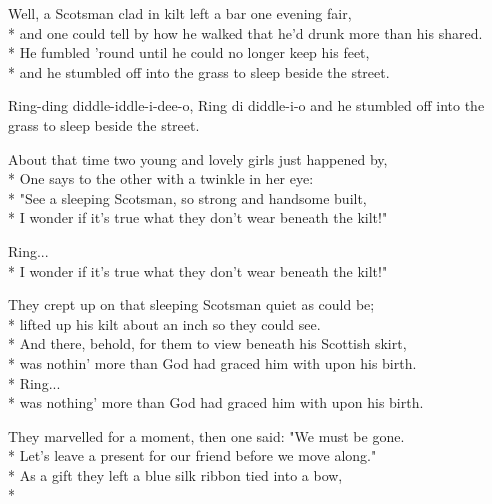 \pagestyle{Längre sånger}
\begin{SongText}
\begin{SongVerse}
Well, a Scotsman clad in kilt left a bar one evening fair,\\*%
and one could tell by how he walked that he'd drunk more than his shared.\\*%
He fumbled 'round until he could no longer keep his feet,\\*%
and he stumbled off into the grass to sleep beside the street.
\end{SongVerse}
\begin{SongVerse}
Ring-ding diddle-iddle-i-dee-o, Ring di diddle-i-o
and he stumbled off into the grass to sleep beside the street.
\end{SongVerse}
\begin{SongVerse}
About that time two young and lovely girls just happened by,\\*%
One says to the other with a twinkle in her eye:\\*%
"See a sleeping Scotsman, so strong and handsome built,\\*%
I wonder if it's true what they don't wear beneath the kilt!"
\end{SongVerse}
\begin{SongVerse}
Ring...\\*%
I wonder if it's true what they don't wear beneath the kilt!"
\end{SongVerse}
\begin{SongVerse}
They crept up on that sleeping Scotsman quiet as could be;\\*%
lifted up his kilt about an inch so they could see.\\*%
And there, behold, for them to view beneath his Scottish skirt,\\*%
was nothin' more than God had graced him with upon his birth. \\*%
Ring...\\*%
was nothing' more than God had graced him with upon his birth.
\end{SongVerse}
\begin{SongVerse}
They marvelled for a moment, then one said: "We must be gone.\\*%
Let's leave a present for our friend before we move along."\\*%
As a gift they left a blue silk ribbon tied into a bow,\\*%

\end{SongVerse}
\end{SongText}

